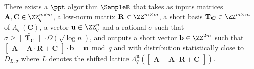 \begin{lemma}\label{lem:sampler}
  There exists a $\ppt$ algorithm $\SampleR$ that takes as inputs matrices $\mathbf{A}, \mathbf{C} \in \ZZ_q^{n \times m}$, a low-norm matrix $\mathbf{R} \in \ZZ^{m \times m}$,
  a short basis $\mathbf{T_C} \in \ZZ^{m \times m}$ of $\Lambda_q^{\perp}(\mathbf{C})$, a vector $\mathbf{u} \in \ZZ_q^{n}$ and a rational $\sigma$ such that $\sigma \geq \|
  \widetilde{\mathbf{T_C}}\| \cdot \Omega(\sqrt{\log n})$, and outputs a short vector $\mathbf{b} \in \ZZ^{2m}$ such that $\left[ \begin{array}{c|c} \mathbf{A} ~ &~ \mathbf{A}
  \cdot \mathbf{R} + \mathbf{C} \end{array} \right]\cdot \mathbf{b} = \mathbf{u} \bmod q$ and with distribution statistically close to $D_{L,\sigma}$ where $L$ denotes the shifted
  lattice $\Lambda^\mathbf{u}_q \left( \left[ \begin{array}{c|c} \mathbf{A} ~&~ \mathbf{A} \cdot \mathbf{R} + \mathbf{C} \end{array} \right] \right)$.
\end{lemma}
